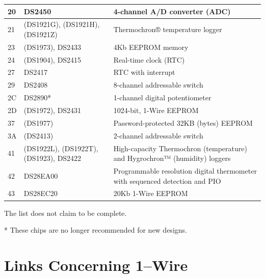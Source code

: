 \begin{center}
\begin{tabular}{|p{}|p{}|p{}|}
20 & DS2450                               & 4-channel A/D converter (ADC) \\ \hline
21 & (DS1921G), (DS1921H), (DS1921Z)      & Thermochron® temperature logger \\ \hline
23 & (DS1973), DS2433                     & 4Kb EEPROM memory \\ \hline
24 & (DS1904), DS2415                     & Real-time clock (RTC) \\ \hline
27 & DS2417                               & RTC with interrupt \\ \hline
29 & DS2408                               & 8-channel addressable switch \\ \hline
2C & DS2890*                              & 1-channel digital potentiometer \\ \hline
2D & (DS1972), DS2431                     & 1024-bit, 1-Wire EEPROM \\ \hline
37 & (DS1977)                             & Password-protected 32KB (bytes) EEPROM \\ \hline
3A & (DS2413)                             & 2-channel addressable switch \\ \hline
41 & (DS1922L), (DS1922T), (DS1923), DS2422 & \raggedright High-capacity Thermochron (temperature) and Hygrochron™ (humidity) loggers \tabularnewline \hline
42 & DS28EA00                             & \raggedright Programmable resolution digital thermometer with sequenced detection and PIO \tabularnewline \hline
43 & DS28EC20                             & 20Kb 1-Wire EEPROM \\ \hline
\end{tabular}
\end{center}

The list does not claim to be complete.

* These chips are no longer recommended for new designs.

\section{Links Concerning 1--Wire}

\\
\\
\\

\\

